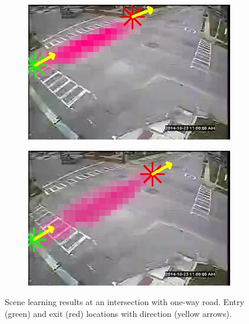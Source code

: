 \begin{figure}
        \begin{subfigure}{0.32\linewidth}
            \includegraphics[width=\linewidth]{./img/scene_learning/res/193402/193402-2.jpg}
        \end{subfigure}
        \begin{subfigure}{0.32\linewidth}
            \includegraphics[width=\linewidth]{./img/scene_learning/res/193402/193402-3.jpg}
        \end{subfigure}
        \caption{Scene learning results at an intersection with one-way road. Entry (green) and exit (red) locations with direction (yellow arrows).}
        \label{fig:entry-exit-full-0}
\end{figure}

